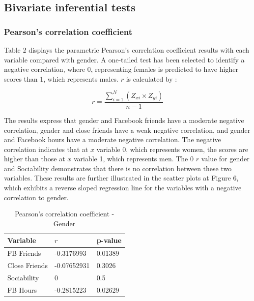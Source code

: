 \subsection{Bivariate inferential tests}

\subsubsection{Pearson's correlation coefficient}

Table 2 displays the parametric Pearson's correlation coefficient results with each variable compared with gender. A one-tailed test has been selected to identify a negative correlation, where 0, representing females is predicted to have higher scores than 1, which represents males. $r$ is calculated by \citep{McKillup2011}:

$$r = \frac{\sum_{i=1}^N (Z_{xi} \times Z_{yi})}{n - 1} $$


The results express that gender and Facebook friends have a moderate negative correlation, gender and close friends have a weak negative correlation, and gender and Facebook hours have a moderate negative correlation. The negative correlation indicates that at $x$ variable 0, which represents women, the scores are higher than those at $x$ variable 1, which represents men. The 0 $r$ value for gender and Sociability demonstrates that there is no correlation between these two variables. These results are further illustrated in the scatter plots at Figure 6, which exhibits a reverse sloped regression line for the variables with a negative correlation to gender.


\begin{table}[H]
\centering
\caption{Pearson's correlation coefficient - Gender}
\begin{tabular}{l|l|l}
Variable      & $r$         & p-value \\ \hline
FB Friends    & -0.3176993  & 0.01389 \\ \hline
Close Friends & -0.07652931 & 0.3026  \\ \hline
Sociability   & 0           & 0.5     \\ \hline
FB Hours      & -0.2815223  & 0.02629 \\ \hline
\end{tabular}
\end{table}

